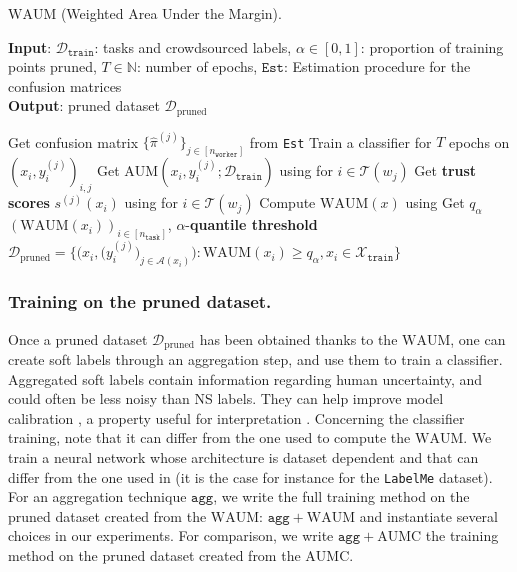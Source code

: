 \begin{algorithm}[tb]
\caption{$\mathrm{WAUM}$ (Weighted Area Under the Margin).}
\label{alg:WAUMstack}
\textbf{Input}:  $\mathcal{D}_{\texttt{train}}$: tasks and crowdsourced labels, $\alpha\in[0,1]$: proportion of training points pruned, $T\in \mathbb{N}$: number of epochs, $\texttt{Est}$: Estimation procedure for the confusion matrices\\
\textbf{Output}: pruned dataset $\mathcal{D}_{\text{pruned}}$
\begin{algorithmic}[1]
\STATE Get confusion matrix $\{\hat{\pi}^{(j)}\}_{j\in[n_\texttt{worker}]}$ from \texttt{Est}
\STATE Train a classifier for $T$ epochs on $\left(x_i, y_i^{(j)}\right)_{i,j}$
\STATE Get $\mathrm{AUM}(x_i, y_i^{(j)}; \mathcal{D}_{\texttt{train}})$ using  for $i\in\mathcal{T}(w_j)$
\STATE Get \textbf{trust scores} $s^{(j)}(x_i)$ using  for $i\in\mathcal{T}(w_j)$
\ENDFOR
{}
\STATE Compute $\mathrm{WAUM}(x)$ using \;
\ENDFOR
\STATE  Get $q_{\alpha}$ $(\mathrm{WAUM}(x_i))_{i\in[n_\texttt{task}]}$, $\alpha$-\textbf{quantile threshold}
\STATE $\mathcal{D}_{\text{pruned}}\!=\!
        \Big\{
        \big( x_i, \big(y_i^{(j)}\big)_{j\in\mathcal{A}(x_i)}\big) \! : \!\mathrm{WAUM}(x_i) \geq q_\alpha,  x_i \in \mathcal{X}_\texttt{train}  \Big
        \}$
\end{algorithmic}
\end{algorithm}

\subsubsection{Training on the pruned dataset.}
Once a pruned dataset $\mathcal{D}_{\text{pruned}}$ has been obtained thanks to the $\mathrm{WAUM}$, one can create soft labels through an aggregation step, and use them to train a classifier.
Aggregated soft labels contain information regarding human uncertainty, and could often be less noisy than NS labels.
They can help improve model calibration \citep{wen2020combining, zhong2021improving}, a property useful for interpretation \citep{jiang2012calibrating, kumar2019verified}.
Concerning the classifier training, note that it can differ from the one used to compute the $\mathrm{WAUM}$.
We train a neural network whose architecture is dataset dependent and that can differ from the one used in  (it is the case for instance for the \texttt{LabelMe} dataset).
For an aggregation technique $\texttt{agg}$, we write the full training method on the pruned dataset created from the $\mathrm{WAUM}$: $\texttt{agg}+\mathrm{WAUM}$ and instantiate several choices in our experiments.
For comparison, we write $\texttt{agg} + \mathrm{AUMC}$ the training method on the pruned dataset created from the $\mathrm{AUMC}$.

